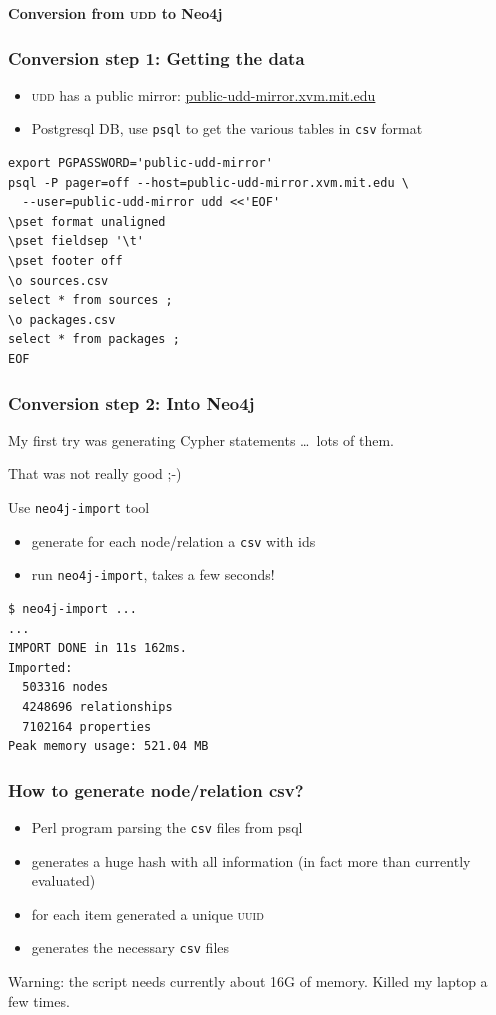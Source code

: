 \documentclass[hyperref]{beamer}
\newcommand{\acro}[1]{\textsc{\MakeLowercase{#1}}}
\newcommand{\cutin}[1]{%
\begin{frame}[c]\begin{center}{\Large\bf\color{myblue}#1}\end{center}\end{frame}}
\def\bis{\\[\bigskipamount]}
\begin{document}
\cutin{Conversion from \acro{UDD} to Neo4j}

\begin{frame}[fragile]
  \frametitle{Conversion step 1: Getting the data}
  \begin{itemize}
  \item \acro{UDD} has a public mirror:
    \url{public-udd-mirror.xvm.mit.edu}\bis
  \item Postgresql DB, use \texttt{psql} to get the various tables in
    \texttt{csv} format
  \end{itemize}
  \begin{lstlisting}
export PGPASSWORD='public-udd-mirror'
psql -P pager=off --host=public-udd-mirror.xvm.mit.edu \
  --user=public-udd-mirror udd <<'EOF'
\pset format unaligned
\pset fieldsep '\t'
\pset footer off
\o sources.csv
select * from sources ;
\o packages.csv
select * from packages ;
EOF
\end{lstlisting}
\end{frame}

\begin{frame}[fragile]
  \frametitle{Conversion step 2: Into Neo4j}
  My first try was generating Cypher statements \ldots\ lots of them.

  \pause That was not really good ;-)\pause

  \begin{block}{Use \texttt{neo4j-import} tool}
    \begin{itemize}
    \item generate for each node/relation a \texttt{csv} with ids
    \item run \texttt{neo4j-import}, takes a few seconds!
    \end{itemize}
  \end{block}
  \pause
  \begin{lstlisting}
$ neo4j-import ...
...
IMPORT DONE in 11s 162ms. 
Imported:
  503316 nodes
  4248696 relationships
  7102164 properties
Peak memory usage: 521.04 MB
\end{lstlisting}
\end{frame}


\begin{frame}
  \frametitle{How to generate node/relation csv?}
  \begin{itemize}
  \item Perl program parsing the \texttt{csv} files from psql\bis
  \item generates a huge hash with all information (in fact more than
    currently evaluated)\bis
  \item for each item generated a unique \acro{UUID}\bis
  \item generates the necessary \texttt{csv} files
  \end{itemize}

  \medskip
  \pause
  Warning: the script needs currently about 16G of memory. Killed my
  laptop a few times.
\end{frame}
\end{document}
